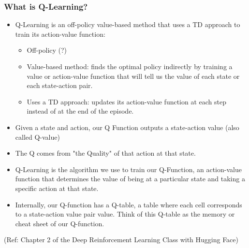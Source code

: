 \begin{frame}[fragile]\frametitle{What is Q-Learning?}

\begin{itemize}

\item Q-Learning is an off-policy value-based method that uses a TD approach to train its action-value function:


\begin{itemize}
\item Off-policy (?)
\item Value-based method: finds the optimal policy indirectly by training a value or action-value function that will tell us the value of each state or each state-action pair.
\item Uses a TD approach: updates its action-value function at each step instead of at the end of the episode.
\end{itemize}

\item Given a state and action, our Q Function outputs a state-action value (also called Q-value)
\item The Q comes from "the Quality" of that action at that state.
\item Q-Learning is the algorithm we use to train our Q-Function, an action-value function that determines the value of being at a particular state and taking a specific action at that state.
\item Internally, our Q-function has a Q-table, a table where each cell corresponds to a state-action value pair value. Think of this Q-table as the memory or cheat sheet of our Q-function.
\end{itemize}


{\tiny (Ref: Chapter 2 of the Deep Reinforcement Learning Class with Hugging Face)}

\end{frame}

